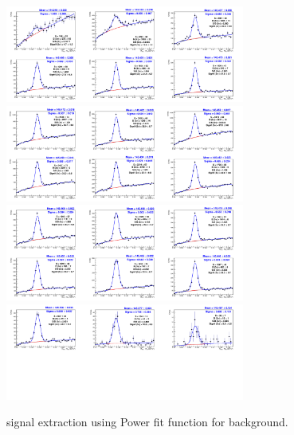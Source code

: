 \begin{figure}[!h]
\begin{center}
\includegraphics[width=0.7\textwidth]{figures/Dstar/pp13TeV/multi_trial/Mass_Spectra_PowerFuncBkg_1-4GeV.png} 
\includegraphics[width=0.7\textwidth]{figures/Dstar/pp13TeV/multi_trial/Mass_Spectra_PowerFuncBkg_4-7GeV.png}
\includegraphics[width=0.7\textwidth]{figures/Dstar/pp13TeV/multi_trial/Mass_Spectra_PowerFuncBkg_7-16GeV.png}
\includegraphics[width=0.7\textwidth]{figures/Dstar/pp13TeV/multi_trial/Mass_Spectra_PowerFuncBkg_16-50GeV.png} 
\caption{\Dstar signal extraction using Power fit function for background.}
\label{fig:DstarYield_Powerbkg}
\end{center}
\end{figure}

